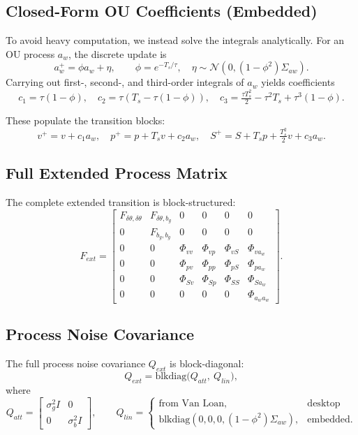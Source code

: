 \documentclass[11pt]{article}
\begin{document}
\subsection{Closed-Form OU Coefficients (Embedded)}
To avoid heavy computation, we instead solve the integrals analytically.  
For an OU process $a_w$, the discrete update is
\[
a_w^+ = \phi a_w + \eta,\qquad
\phi=e^{-T_s/\tau},\quad
\eta\sim\mathcal{N}(0,(1-\phi^2)\Sigma_{aw}).
\]
Carrying out first-, second-, and third-order integrals of $a_w$ yields coefficients
\[
c_1=\tau(1-\phi),\quad
c_2=\tau\!\left(T_s-\tau(1-\phi)\right),\quad
c_3=\tfrac{\tau T_s^2}{2}-\tau^2T_s+\tau^3(1-\phi).
\]

These populate the transition blocks:
\[
v^+ = v + c_1 a_w,\quad
p^+ = p + T_s v + c_2 a_w,\quad
S^+ = S + T_s p + \tfrac{T_s^2}{2}v + c_3 a_w.
\]

\subsection{Full Extended Process Matrix}
The complete extended transition is block-structured:
\[
F_{ext} =
\begin{bmatrix}
F_{\delta\theta,\delta\theta} & F_{\delta\theta,b_g} & 0 & 0 & 0 & 0 \\
0 & F_{b_g,b_g} & 0 & 0 & 0 & 0 \\
0 & 0 & \Phi_{vv} & \Phi_{vp} & \Phi_{vS} & \Phi_{va_w} \\
0 & 0 & \Phi_{pv} & \Phi_{pp} & \Phi_{pS} & \Phi_{pa_w} \\
0 & 0 & \Phi_{Sv} & \Phi_{Sp} & \Phi_{SS} & \Phi_{Sa_w} \\
0 & 0 & 0 & 0 & 0 & \Phi_{a_w a_w}
\end{bmatrix}.
\]

\subsection{Process Noise Covariance}
The full process noise covariance $Q_{ext}$ is block-diagonal:
\[
Q_{ext} = \mathrm{blkdiag}\big(Q_{att},\ Q_{lin}\big),
\]
where
\[
Q_{att}=\begin{bmatrix}
\sigma_g^2 I & 0 \\ 0 & \sigma_b^2 I
\end{bmatrix},\qquad
Q_{lin}=\begin{cases}
\text{from Van Loan,} & \text{desktop} \\[6pt]
\mathrm{blkdiag}(0,0,0,(1-\phi^2)\Sigma_{aw}), & \text{embedded}.
\end{cases}
\]
\end{document}
